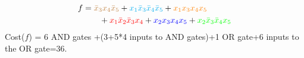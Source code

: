 \documentclass[twocolumn]{article}
\newcommand{\bx}{\bar{x}}
\begin{document}
% 
\begin{align}
  f &= {\color{brown} \bx_3 x_4\bx_5} + {\color{cyan} x_1 \bx_3 \bx_4 \bx_5}
      + {\color{orange} x_1 x_3 x_4 x_5 }
  \notag\\&\qquad
      + {\color{red} x_1 \bx_2\bx_3x_4}
      + {\color{blue} x_2x_3 x_4x_5}
      + {\color{green} x_2\bx_3 \bx_4 x_5}
\end{align}
% 
Cost($f$) = 6 AND gates +(3+5*4 inputs to AND gates)+1 OR gate+6 inputs to the
OR gate=36.

%
%
\end{document}
